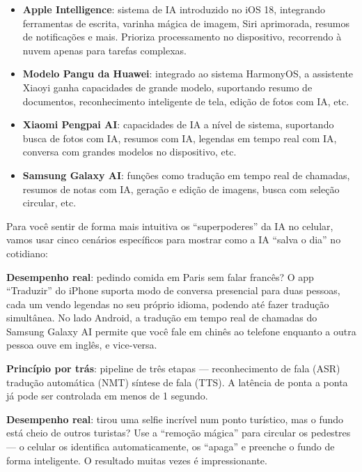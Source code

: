 
\begin{itemize}
  \item \textbf{Apple Intelligence}: sistema de IA introduzido no iOS 18, integrando ferramentas de escrita, varinha mágica de imagem, Siri aprimorada, resumos de notificações e mais. Prioriza processamento no dispositivo, recorrendo à nuvem apenas para tarefas complexas.
  \item \textbf{Modelo Pangu da Huawei}: integrado ao sistema HarmonyOS, a assistente Xiaoyi ganha capacidades de grande modelo, suportando resumo de documentos, reconhecimento inteligente de tela, edição de fotos com IA, etc.
  \item \textbf{Xiaomi Pengpai AI}: capacidades de IA a nível de sistema, suportando busca de fotos com IA, resumos com IA, legendas em tempo real com IA, conversa com grandes modelos no dispositivo, etc.
  \item \textbf{Samsung Galaxy AI}: funções como tradução em tempo real de chamadas, resumos de notas com IA, geração e edição de imagens, busca com seleção circular, etc.
\end{itemize}


Para você sentir de forma mais intuitiva os “superpoderes” da IA no celular, vamos usar cinco cenários específicos para mostrar como a IA “salva o dia” no cotidiano:


\textbf{Desempenho real}: pedindo comida em Paris sem falar francês? O app “Traduzir” do iPhone suporta modo de conversa presencial para duas pessoas, cada um vendo legendas no seu próprio idioma, podendo até fazer tradução simultânea. No lado Android, a tradução em tempo real de chamadas do Samsung Galaxy AI permite que você fale em chinês ao telefone enquanto a outra pessoa ouve em inglês, e vice-versa.

\textbf{Princípio por trás}: pipeline de três etapas — reconhecimento de fala (ASR) tradução automática (NMT) síntese de fala (TTS). A latência de ponta a ponta já pode ser controlada em menos de 1 segundo.


\textbf{Desempenho real}: tirou uma selfie incrível num ponto turístico, mas o fundo está cheio de outros turistas? Use a “remoção mágica” para circular os pedestres — o celular os identifica automaticamente, os “apaga” e preenche o fundo de forma inteligente. O resultado muitas vezes é impressionante.

